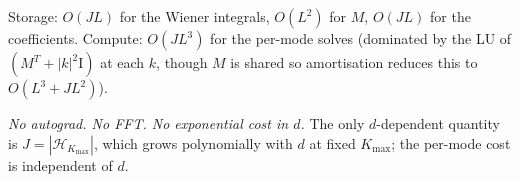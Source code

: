 Storage: $O(JL)$ for the Wiener integrals, $O(L^2)$ for $M$, $O(JL)$
for the coefficients. Compute: $O(JL^3)$ for the per-mode solves
(dominated by the LU of $(M^T + |k|^2\mathrm{I})$ at each $k$, though
$M$ is shared so amortisation reduces this to $O(L^3 + JL^2)$).

\emph{No autograd. No FFT. No exponential cost in $d$.} The only
$d$-dependent quantity is $J = |\mathcal{H}_{K_{\max}}|$, which grows
polynomially with $d$ at fixed $K_{\max}$; the per-mode cost is
independent of $d$.
